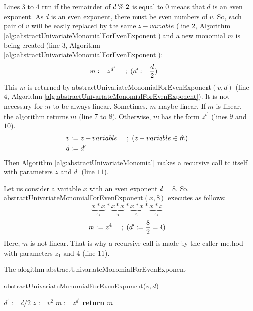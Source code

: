 \noindent Lines $3$ to $4$ run if the remainder of $d \hspace{1mm}\%\hspace{1mm} 2$ is equal to $0$ means that $d$ is an even exponent.
As $d$ is an even exponent, there must be even numbers of $v$.
So, each pair of $v$ will be easily replaced by the same $z-variable$ (line $2$, Algorithm \ref{alg:abstractUnivariateMonomialForEvenExponent}) and a new monomial $m$ is being created (line $3$, Algorithm \ref{alg:abstractUnivariateMonomialForEvenExponent}):
\begin{align}
    m &:= z^{d^{\prime}} \hspace{5mm} ;\hspace{1mm}(d^\prime := \frac{d}{2}) \label{eqn:mPrime}
\end{align}
This $m$ is returned by abstractUnivariateMonomialForEvenExponent$(v, d)$ (line $4$, Algorithm \ref{alg:abstractUnivariateMonomialForEvenExponent}).
It is not necessary for $m$ to be always linear.
Sometimes. $m$ maybe linear.
If $m$ is linear, the algorithm returns $m$ (line $7$ to $8$).
Otherwise, $m$ has the form $z^{d^{\prime}}$ (lines $9$ and $10$).
\begin{align}
    v &:= z-variable \hspace{5mm} ;\hspace{1mm}(z-variable \in \hat{m}) \label{eqn:v} \\
    d &:= d^\prime \label{eqn:d}
\end{align}
Then Algorithm \ref{alg:abstractUnivariateMonomial} makes a recursive call to itself with parameters $z$ and $d^\prime$ (line $11$).\newline

\begin{example}
\label{example:even}
Let us consider a variable $x$ with an even exponent $d = 8$.
So, abstractUnivariateMonomialForEvenExponent$(x, 8)$ executes as follows:
	$$\underbrace{ x \ast x }\limits_{z_{1}} \ast \underbrace{ x \ast x }\limits_{z_{1}} \ast \underbrace{ x \ast x }\limits_{z_{1}} \ast \underbrace{ x \ast x }\limits_{z_{1}}$$
	$$m := z_{1}^4 \hspace{5mm} ;\hspace{1mm}(d^\prime := \frac{8}{2} = 4)$$
	Here, $m$ is not linear. 
	That is why a recursive call is made by the caller method with parameters $z_{1} \text{ and } 4$ (line $11$).
\end{example}

\begin{algorithm}
\caption{The alogithm abstractUnivariateMonomialForEvenExponent} 
\label{alg:abstractUnivariateMonomialForEvenExponent}
abstractUnivariateMonomialForEvenExponent($v, d$)
\begin{algorithmic}[1]
\State $d^\prime := d/2$
\State $z:= v^2$
\State $m := z^{d^\prime}$
\State \textbf{return} $m$
\end{algorithmic}
\end{algorithm}

